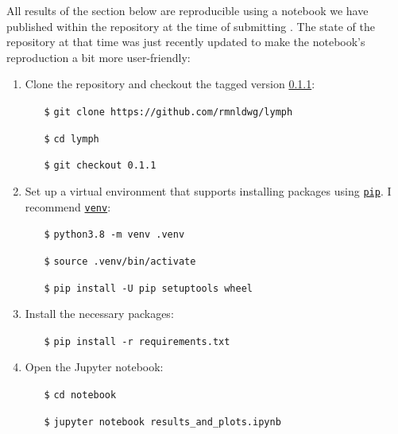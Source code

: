 \begin{tcolorbox}[title=\faIcon{recycle} Reproducibility, parbox=false]
    All results of the section below are reproducible using a notebook we have published within the  repository at the time of submitting \cite{ludwig_hidden_2021}. The state of the repository at that time was just recently updated to make the notebook's reproduction a bit more user-friendly:

    \begin{enumerate}
        \item Clone the  repository and checkout the tagged version \href{https://github.com/rmnldwg/lymph/tree/0.1.1}{ 0.1.1}:
        \begin{itemize}[leftmargin=10mm]
            \setlength\itemsep{-0.5em}
            \item[\texttt{\$}] \verb|git clone https://github.com/rmnldwg/lymph|
            \item[\texttt{\$}] \verb|cd lymph|
            \item[\texttt{\$}] \verb|git checkout 0.1.1|
        \end{itemize}

        \item Set up a virtual environment that supports installing packages using \href{https://pypi.org/project/pip/}{\texttt{pip}}. I recommend \href{https://docs.python.org/3/library/venv.html}{\texttt{venv}}:
        \begin{itemize}[leftmargin=10mm]
            \setlength\itemsep{-0.5em}
            \item[\texttt{\$}] \verb|python3.8 -m venv .venv|
            \item[\texttt{\$}] \verb|source .venv/bin/activate|
            \item[\texttt{\$}] \verb|pip install -U pip setuptools wheel|
        \end{itemize}

        \item Install the necessary packages:
        \begin{itemize}[leftmargin=10mm]
            \setlength\itemsep{-0.5em}
            \item[\texttt{\$}] \verb|pip install -r requirements.txt|
        \end{itemize}

        \item Open the Jupyter notebook:
        \begin{itemize}[leftmargin=10mm]
            \setlength\itemsep{-0.5em}
            \item[\texttt{\$}] \verb|cd notebook|
            \item[\texttt{\$}] \verb|jupyter notebook results_and_plots.ipynb|
        \end{itemize}
    \end{enumerate}


\end{tcolorbox}
